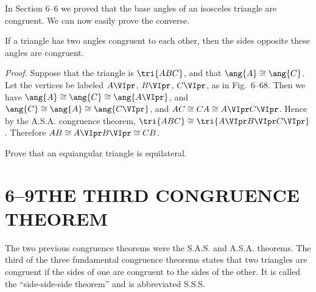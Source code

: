 \documentclass[11pt]{book}
\makeatletter
\theoremstyle{bkplain}
\newcommand{\VIgp}[2]{%
  \ifvmode\leavevmode\else\par\smallskip\noindent\fi
  \begin{tabular}[t]{@{}l@{\hspace{0.6em}}l@{}}
    Given: & \begin{tabular}[t]{@{}l@{}}#1\end{tabular}\\[2pt]
    Prove: & \begin{tabular}[t]{@{}l@{}}#2\end{tabular}
  \end{tabular}\par\smallskip}
\theoremstyle{XIplainnote}
\theoremstyle{bkplain}
\theoremstyle{bkplain}
\makeatother
\begin{document}
\begin{exercisecols}
\end{exercisecols}

In Section 6--6 we proved that the base angles of an isosceles triangle are
congruent. We can now easily prove the converse.

\begin{theorem}
If a triangle has two angles congruent to each other, then the sides opposite
these angles are congruent.
\end{theorem}

\emph{Proof.} Suppose that the triangle is $$, and that $\ang{A} \cong
\ang{C}$. Let the vertices be labeled $A\VIpr$, $B\VIpr$, $C\VIpr$, as in
Fig.~6--68. Then we have $\ang{A} \cong \ang{C} \cong \ang{A\VIpr}$, and
$\ang{C} \cong \ang{A} \cong \ang{C\VIpr}$, and $AC \cong CA \cong A\VIpr
C\VIpr$. Hence by the A.S.A. congruence theorem, $ \cong {}$. Therefore $AB \cong A\VIpr B\VIpr \cong CB$.

\FIGVISIXTYEIGHT

Prove that an equiangular triangle is equilateral.

\section*{6--9\quad THE THIRD CONGRUENCE THEOREM}

The two previous congruence theorems were the S.A.S. and A.S.A. theorems. The
third of the three fundamental congruence theorems states that two triangles
are congruent if the sides of one are congruent to the sides of the other. It
is called the ``side-side-side theorem'' and is abbreviated S.S.S.
\end{document}
